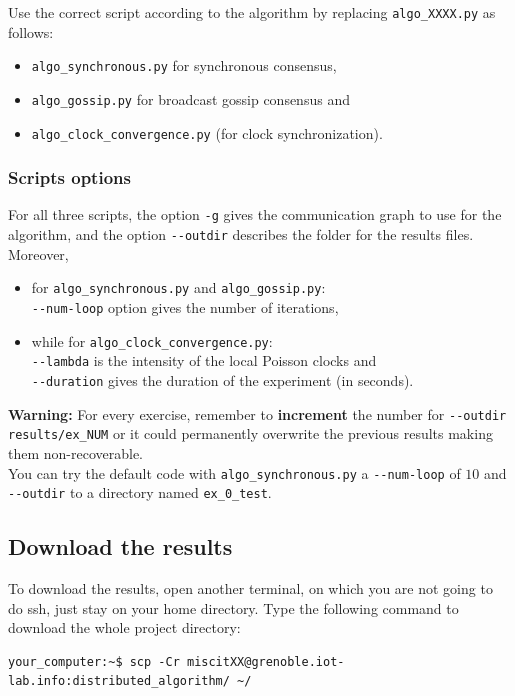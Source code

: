\documentclass{article}
\begin{document}
Use the correct script according to the algorithm by replacing
\verb=algo_XXXX.py= as follows:
\begin{itemize}
    \item \verb=algo_synchronous.py= for synchronous consensus,
    \item \verb=algo_gossip.py= for broadcast gossip consensus and
    \item \verb=algo_clock_convergence.py= (for clock synchronization).
\end{itemize}

\subsubsection{Scripts options}

For all three scripts, the option \verb=-g= gives the communication graph to use for the algorithm,
and the option \verb=--outdir= describes the folder for the results files.\\

Moreover,
\begin{itemize}
    \item for \verb=algo_synchronous.py= and \verb=algo_gossip.py=:\\
        \verb=--num-loop= option gives the number of iterations,
    \item while for \verb=algo_clock_convergence.py=:\\
        \verb=--lambda= is the intensity of the local Poisson clocks and\\
        \verb=--duration= gives the duration of the experiment (in seconds).
\end{itemize}

\textbf{Warning:} For every exercise, remember to \textbf{increment} the number for \verb=--outdir results/ex_NUM=
or it could permanently overwrite the previous results making them non-recoverable.\\

You can try the default code with \verb=algo_synchronous.py= a \verb=--num-loop= of $10$ and
\verb=--outdir= to a directory named \verb=ex_0_test=.


\subsection{Download the results}

To download the results, open another terminal, on which you are not going to do ssh, just stay on your home directory.
Type the following command to download the whole project directory:
\begin{verbatim}
your_computer:~$ scp -Cr miscitXX@grenoble.iot-lab.info:distributed_algorithm/ ~/
\end{verbatim}
\end{document}
